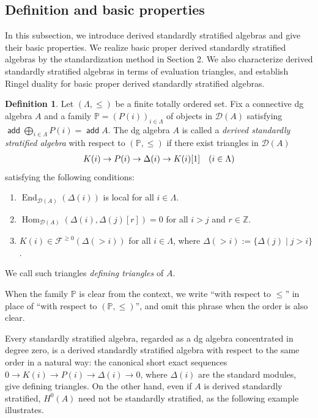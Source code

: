 \documentclass[a4paper,reqno,11pt]{amsart}
\numberwithin{equation}{section}
\theoremstyle{definition}
\newtheorem{definition}[theorem]{Definition}
\newcommand{\D}{\mathcal{D}}
\newcommand{\F}{\mathcal{F}}
\newcommand{\ZZ}{\mathbb{Z}}
\newcommand{\PP}{\mathbb{P}}
\newcommand{\bde}{\Delta}
\DeclareMathOperator{\add}{\mathsf{add}}
\DeclareMathOperator{\End}{End}
\DeclareMathOperator{\Hom}{Hom}
\begin{document}
\subsection{Definition and basic properties}

In this subsection, we introduce derived standardly stratified algebras and give their basic properties.
We realize basic proper derived standardly stratified algebras by the standardization method in Section 2.
We also characterize derived standardly stratified algebras in terms of evaluation triangles, and establish Ringel duality for basic proper derived standardly stratified algebras.

\begin{definition}\label{def:dss}
Let $(\Lambda,\leq)$ be a finite totally ordered set.
Fix a connective dg algebra $A$ and a family $\PP=(P(i))_{i\in\Lambda}$ of objects in $\D(A)$ satisfying $\add\bigoplus_{i\in\Lambda}P(i)=\add A$.
The dg algebra $A$ is called a \emph{derived standardly stratified algebra} with respect to $(\PP,\leq)$ if there exist triangles in $\D(A)$
\begin{align}
K(i)\to P(i)\to \bde(i)\to K(i)[1] \quad(i\in\Lambda)\notag
\end{align}
satisfying the following conditions:
\begin{enumerate}
\item[(DS1)] $\End_{\D(A)}(\bde(i))$ is local for all $i\in\Lambda$.
\item[(DS2)] $\Hom_{\D(A)}(\bde(i),\bde(j)[r])=0$ for all $i>j$ and $r\in\ZZ$.
\item[(DS3)] $K(i)\in\F^{\geq 0}(\bde(>i))$ for all $i\in\Lambda$, where $\bde(>i):=\{\bde(j)\mid j>i\}$.
\end{enumerate}
We call such triangles \emph{defining triangles} of $A$.
\end{definition}

When the family $\PP$ is clear from the context, we write ``with respect to $\leq$'' in place of ``with respect to $(\PP,\leq)$'', and omit this phrase when the order is also clear.

Every standardly stratified algebra, regarded as a dg algebra concentrated in degree zero, is a derived standardly stratified algebra with respect to the same order in a natural way: the canonical short exact sequences $0\to K(i)\to P(i)\to\Delta(i)\to 0$, where $\Delta(i)$ are the standard modules, give defining triangles.
On the other hand, even if $A$ is derived standardly stratified, $H^{0}(A)$ need not be standardly stratified, as the following example illustrates.
\end{document}
